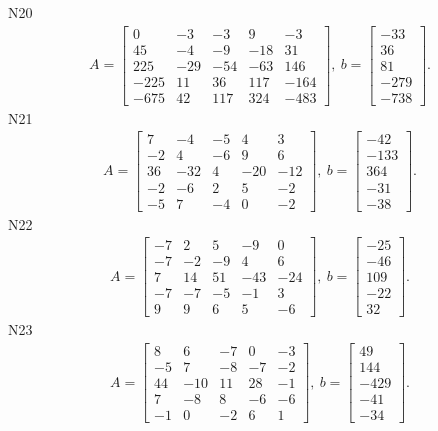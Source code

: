 \documentclass[11pt]{report}
\begin{document}
N20
\begin{align*}
 A = \left[\begin{matrix}0 & -3 & -3 & 9 & -3\\45 & -4 & -9 & -18 & 31\\225 & -29 & -54 & -63 & 146\\-225 & 11 & 36 & 117 & -164\\-675 & 42 & 117 & 324 & -483\end{matrix}\right],
\ b = \left[\begin{matrix}-33\\36\\81\\-279\\-738\end{matrix}\right]. 
 \end{align*}
N21
\begin{align*}
 A = \left[\begin{matrix}7 & -4 & -5 & 4 & 3\\-2 & 4 & -6 & 9 & 6\\36 & -32 & 4 & -20 & -12\\-2 & -6 & 2 & 5 & -2\\-5 & 7 & -4 & 0 & -2\end{matrix}\right],
\ b = \left[\begin{matrix}-42\\-133\\364\\-31\\-38\end{matrix}\right]. 
 \end{align*}
N22
\begin{align*}
 A = \left[\begin{matrix}-7 & 2 & 5 & -9 & 0\\-7 & -2 & -9 & 4 & 6\\7 & 14 & 51 & -43 & -24\\-7 & -7 & -5 & -1 & 3\\9 & 9 & 6 & 5 & -6\end{matrix}\right],
\ b = \left[\begin{matrix}-25\\-46\\109\\-22\\32\end{matrix}\right]. 
 \end{align*}
N23
\begin{align*}
 A = \left[\begin{matrix}8 & 6 & -7 & 0 & -3\\-5 & 7 & -8 & -7 & -2\\44 & -10 & 11 & 28 & -1\\7 & -8 & 8 & -6 & -6\\-1 & 0 & -2 & 6 & 1\end{matrix}\right],
\ b = \left[\begin{matrix}49\\144\\-429\\-41\\-34\end{matrix}\right]. 
 \end{align*}
\end{document}
